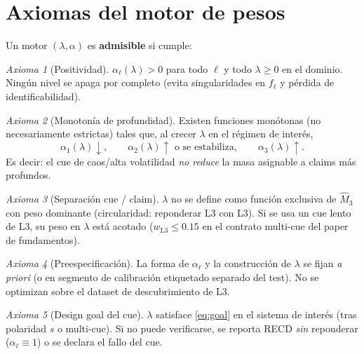\documentclass[11pt,a4paper]{article}
\theoremstyle{definition}
\theoremstyle{plain}
\theoremstyle{remark}
\newtheorem{axiom}{Axioma}[section]
\begin{document}
\section{Axiomas del motor de pesos}
\label{sec:axioms}

Un motor $(\lambda,\alpha)$ es \textbf{admisible} si cumple:

\begin{axiom}[Positividad]
\label{ax:pos}
$\alpha_\ell(\lambda)>0$ para todo $\ell$ y todo $\lambda\ge 0$ en el
dominio. Ning\'un nivel se apaga por completo (evita singularidades en
$f_\ell$ y p\'erdida de identificabilidad).
\end{axiom}

\begin{axiom}[Monoton\'ia de profundidad]
\label{ax:mono}
Existen funciones mon\'otonas (no necesariamente estrictas) tales que,
al crecer $\lambda$ en el r\'egimen de inter\'es,
\begin{equation}
\alpha_1(\lambda)\downarrow,\qquad
\alpha_2(\lambda)\uparrow\text{ o se estabiliza},\qquad
\alpha_3(\lambda)\uparrow.
\end{equation}
Es decir: el cue de caos/alta volatilidad \emph{no reduce} la masa
asignable a claims m\'as profundos.
\end{axiom}

\begin{axiom}[Separación cue / claim]
\label{ax:sep}
$\lambda$ no se define como funci\'on exclusiva de $\widehat{M}_3$ con
peso dominante (circularidad: reponderar L3 con L3). Si se usa un cue
lento de L3, su peso en $\lambda$ est\'a acotado
($w_{\mathrm{L3}}\le 0.15$ en el contrato multi-cue del paper de
fundamentos).
\end{axiom}

\begin{axiom}[Preespecificación]
\label{ax:pre}
La forma de $\alpha_\ell$ y la construcci\'on de $\lambda$ se fijan
\emph{a priori} (o en segmento de calibración etiquetado separado del
test). No se optimizan sobre el dataset de descubrimiento de L3.
\end{axiom}

\begin{axiom}[Design goal del cue]
\label{ax:goal}
$\lambda$ satisface \eqref{eq:goal} en el sistema de inter\'es (tras
polaridad $s$ o multi-cue). Si no puede verificarse, se reporta RECD
\emph{sin} reponderar ($\alpha_\ell\equiv 1$) o se declara el fallo del
cue.
\end{axiom}
\end{document}
